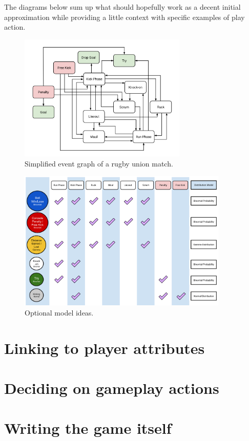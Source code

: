 \documentclass[sts]{imsart}
\begin{document}
The diagrams below sum up what should hopefully work as a decent initial approximation while providing a little context with specific examples of play action.

\begin{figure}[h]
\includegraphics[width=8cm]{images/trywizard-event-graph.png}
\caption{Simplified event graph of a rugby union match.}
\label{fig:event-graph}
\end{figure}

\begin{figure}[h]
\includegraphics[width=10cm]{images/trywizard-model-ideas-sketch.png}
\caption{Optional model ideas.}
\label{fig:model-ideas}
\end{figure}

\section*{Linking to player attributes}

\section*{Deciding on gameplay actions}

\section*{Writing the game itself}


\newpage


\end{document}
